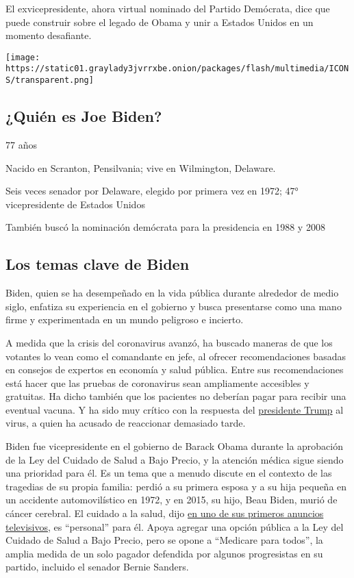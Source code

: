 El exvicepresidente, ahora virtual nominado del Partido Demócrata, dice
que puede construir sobre el legado de Obama y unir a Estados Unidos en
un momento desafiante.

\texttt{[image: https://static01.graylady3jvrrxbe.onion/packages/flash/multimedia/ICONS/transparent.png]}

\hypertarget{quiuxe9n-es-joe-biden}{%
\subsection{¿Quién es Joe Biden?}\label{quiuxe9n-es-joe-biden}}

77 años

Nacido en Scranton, Pensilvania; vive en Wilmington, Delaware.

Seis veces senador por Delaware, elegido por primera vez en 1972; 47°
vicepresidente de Estados Unidos

También buscó la nominación demócrata para la presidencia en 1988 y 2008

\hypertarget{los-temas-clave-de-biden}{%
\subsection{Los temas clave de Biden}\label{los-temas-clave-de-biden}}

Biden, quien se ha desempeñado en la vida pública durante alrededor de
medio siglo, enfatiza su experiencia en el gobierno y busca presentarse
como una mano firme y experimentada en un mundo peligroso e incierto.

A medida que la crisis del coronavirus avanzó, ha buscado maneras de que
los votantes lo vean como el comandante en jefe, al ofrecer
recomendaciones basadas en consejos de expertos en economía y salud
pública. Entre sus recomendaciones está hacer que las pruebas de
coronavirus sean ampliamente accesibles y gratuitas. Ha dicho también
que los pacientes no deberían pagar para recibir una eventual vacuna. Y
ha sido muy crítico con la respuesta del
\href{https://www.nytimes3xbfgragh.onion/interactive/2020/07/13/espanol/mundo/donald-trump-elecciones.html}{presidente
Trump} al virus, a quien ha acusado de reaccionar demasiado tarde.

Biden fue vicepresidente en el gobierno de Barack Obama durante la
aprobación de la Ley del Cuidado de Salud a Bajo Precio, y la atención
médica sigue siendo una prioridad para él. Es un tema que a menudo
discute en el contexto de las tragedias de su propia familia: perdió a
su primera esposa y a su hija pequeña en un accidente automovilístico en
1972, y en 2015, su hijo, Beau Biden, murió de cáncer cerebral. El
cuidado a la salud, dijo
\href{https://www.nytimes3xbfgragh.onion/2019/08/27/us/politics/joe-biden-ad-personal.html}{en
uno de sus primeros anuncios televisivos}, es ``personal'' para él.
Apoya agregar una opción pública a la Ley del Cuidado de Salud a Bajo
Precio, pero se opone a ``Medicare para todos'', la amplia medida de un
solo pagador defendida por algunos progresistas en su partido, incluido
el senador Bernie Sanders.

